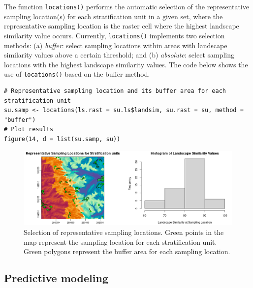 The function \texttt{locations()} performs the automatic selection of the
representative sampling location(s) for each stratification unit in a given set,
where the representative sampling location is the raster cell where the highest
landscape similarity value occurs. Currently, \texttt{locations()} implements two
selection methods: (a) \emph{buffer}: select sampling locations within areas with
landscape similarity values above a certain threshold; and (b) \emph{absolute}:
select sampling locations with the highest landscape similarity values. The code
below shows the use of \texttt{locations()} based on the buffer method.

\begin{verbatim}
# Representative sampling location and its buffer area for each stratification unit
su.samp <- locations(ls.rast = su.ls$landsim, su.rast = su, method = "buffer")
# Plot results
figure(14, d = list(su.samp, su))
\end{verbatim}

\begin{figure}[H]

{\centering \includegraphics[width=1\linewidth,height=0.2\textheight]{figures/figure_14} 

}

\caption{Selection of representative sampling locations. Green points in the map represent the sampling location for each stratification unit. Green polygons represent the buffer area for each sampling location.}\label{fig:f15}
\end{figure}

\hypertarget{predictive-modeling}{%
\subsection{Predictive modeling}\label{predictive-modeling}}

